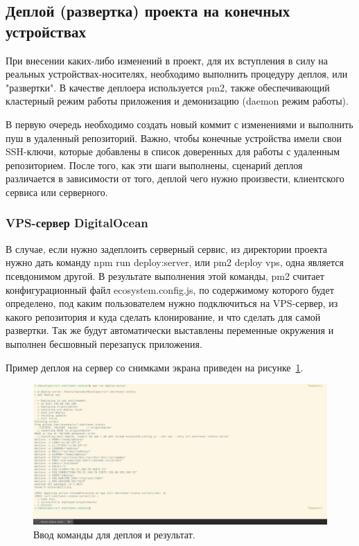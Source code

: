 \documentclass[a4paper, 12pt]{article}
\begin{document}
    \subsection*{Деплой (развертка) проекта на конечных устройствах}
    При внесении каких-либо изменений в проект, для их вступления в силу на реальных устройствах-носителях, необходимо
    выполнить процедуру деплоя, или "развертки". В качестве деплоера используется pm2, также обеспечивающий кластерный режим
    работы приложения и демонизацию (daemon режим работы).

    В первую очередь необходимо создать новый коммит с изменениями и выполнить пуш в удаленный репозиторий. Важно, чтобы
    конечные устройства имели свои SSH-ключи, которые добавлены в список доверенных для работы с удаленным репозиторием.
    После того, как эти шаги выполнены, сценарий деплоя различается в зависимости от того, деплой чего нужно произвести,
    клиентского сервиса или серверного.

    \subsubsection*{VPS-сервер DigitalOcean}
    В случае, если нужно задеплоить серверный сервис, из директории проекта нужно дать команду npm run deploy:server, или
    pm2 deploy vps, одна является псевдонимом другой.
    В результате выполнения этой команды, pm2 считает конфигурационный файл ecosystem.config.js, по содержимому которого
    будет определено, под каким пользователем нужно подключиться на VPS-сервер, из какого репозитория и куда сделать
    клонирование, и что сделать для самой развертки. Так же будут автоматически выставлены переменные окружения и выполнен
    бесшовный перезапуск приложения.

    Пример деплоя на сервер со снимками экрана приведен на рисунке~\ref{fig:deploy}.

    \begin{figure}
        \includegraphics[width=\linewidth]{img/deploy.jpg}
        \caption{Ввод команды для деплоя и результат.}
        \label{fig:deploy}
    \end{figure}
\end{document}
